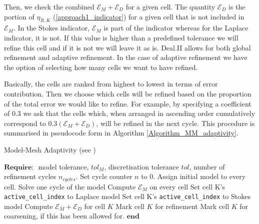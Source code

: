 \documentclass[12pt,a4paper]{article}
\theoremstyle{definition}
\begin{document}
Then, we check the combined $\mathcal{E}_M+\mathcal{E}_D$ for a given cell.  The quantity $\mathcal{E}_D$ is the portion of $\eta_{R,K}$ (\ref{approach1_indicator}) for a given cell that is not included in $\mathcal{E}_M$.  In the Stokes indicator, $\mathcal{E}_M$ is part of the indicator whereas for the Laplace indicator, it is not.  If this value is higher than a predefined tolerance we will refine this cell and if it is not we will leave it as is.  Deal.II allows for both global refinement and adaptive refinement.  In the case of adaptive refinement we have the option of selecting how many cells we want to have refined.  

Basically, the cells are ranked  from highest to lowest in terms of error contribution.  Then we choose which cells will be refined based on the proportion of the total error we would like to refine.  For example, by specifying a coefficient of 0.3 we ask that the cells which, when arranged in ascending order cumulatively correspond to $0.3\left(\mathcal{E}_M+\mathcal{E}_D\right)$, will be refined in the next cycle.  This procedure is summarised in pseudocode form in Algorithm \ref{Algorithm_MM_adaptivity}.
 \begin{algorithm}[t]
 	\caption{Model-Mesh Adaptivity (see \cite[\S6: Algorithm 6.1]{giesselmann2017posteriori})}\label{Algorithm_MM_adaptivity}
 	\begin{algorithmic}
 		\State $\textbf{Require: }$ model tolerance, $tol_{M}$, discretisation tolerance $tol$, number of refinement cycles $n_{cycles}$.
 		\State Set cycle counter $n$ to $0$.
 		\State Assign initial  model to every cell.
 		\State Solve one cycle of the model
 		\State Compute $\mathcal{E}_M$ on every cell
 		\State Set cell K's \texttt{active\_cell\_index} to Laplace model
 		\Else
 		\State Set cell K's \texttt{active\_cell\_index} to Stokes model
 		\EndIf
 		\State Compute $\mathcal{E}_M+\mathcal{E}_D$ for cell $K$
 		\State Mark cell $K$ for refinement
 		\Else
 		\State Mark cell $K$ for coarsening, if this has been allowed for.
 		\EndIf
 		\EndFor
 		\EndWhile
 		\State $\textbf{end}$
 	\end{algorithmic}
 \end{algorithm}
\end{document}
